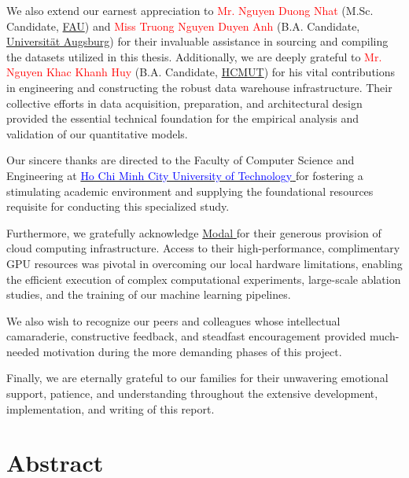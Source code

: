 \medskip

We also extend our earnest appreciation to \textcolor{red}{Mr. Nguyen Duong Nhat} (M.Sc. Candidate, \href{https://www.fau.de/}{FAU}) and \textcolor{red}{Miss Truong Nguyen Duyen Anh} (B.A. Candidate, \href{https://www.uni-augsburg.de/en/}{Universität Augsburg}) for their invaluable assistance in sourcing and compiling the datasets utilized in this thesis. Additionally, we are deeply grateful to \textcolor{red}{Mr. Nguyen Khac Khanh Huy} (B.A. Candidate, \href{https://hcmut.edu.vn/}{HCMUT}) for his vital contributions in engineering and constructing the robust data warehouse infrastructure. Their collective efforts in data acquisition, preparation, and architectural design provided the essential technical foundation for the empirical analysis and validation of our quantitative models.

\medskip

Our sincere thanks are directed to the Faculty of Computer Science and Engineering at \href{https://hcmut.edu.vn}{\textcolor{blue}{Ho Chi Minh City University of Technology} } for fostering a stimulating academic environment and supplying the foundational resources requisite for conducting this specialized study.

\medskip

Furthermore, we gratefully acknowledge \href{https://modal.com}{\textcolor{modal-color}{Modal} } for their generous provision of cloud computing infrastructure. Access to their high-performance, complimentary \acl{GPU} resources was pivotal in overcoming our local hardware limitations, enabling the efficient execution of complex computational experiments, large-scale ablation studies, and the training of our machine learning pipelines.

\medskip

We also wish to recognize our peers and colleagues whose intellectual camaraderie, constructive feedback, and steadfast encouragement provided much-needed motivation during the more demanding phases of this project.

\medskip

Finally, we are eternally grateful to our families for their unwavering emotional support, patience, and understanding throughout the extensive development, implementation, and writing of this report.

\clearpage

\part*{Abstract}
\clearpage
